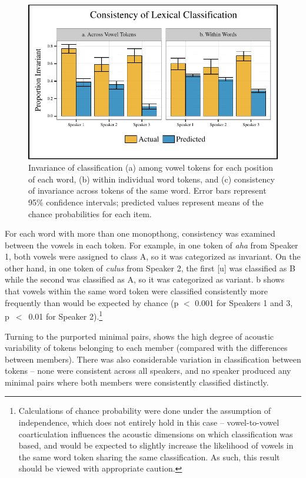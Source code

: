 \documentclass[output=paper,newtxmath,modfonts,nonflat,hidelinks]{langsci/langscibook}
\begin{document}
\begin{figure}
\includegraphics[height=.35\textheight]{figures/lexclass.pdf}
\caption{Invariance of classification (a) among vowel tokens for each position of each word, (b) within individual word tokens, and (c) consistency of invariance across tokens of the same word.  
Error bars represent 95\% confidence intervals; predicted values represent means of the chance probabilities for each item.}
\label{fig:kbgy:4}
\end{figure}

For each word with more than one monopthong, consistency was examined between the vowels in each token.  For example, in one token of \emph{aha} from Speaker 1, both vowels were assigned to class A, so it was categorized as invariant.  On the other hand, in one token of \emph{culus} from Speaker 2, the first [u] was classified as B while the second was classified as A, so it was categorized as variant.  b shows that vowels within the same word token were classified consistently more frequently than would be expected by chance (p $<$ 0.001 for Speakers 1 and 3, p~$<$~0.01 for Speaker 2).\footnote{Calculations of chance probability were done under the assumption of independence, which does not entirely hold in this case -- vowel-to-vowel coarticulation influences the acoustic dimensions on which classification was based, and would be expected to slightly increase the likelihood of vowels in the same word token sharing the same classification.  As such, this result should be viewed with appropriate caution.}

Turning to the purported minimal pairs,  shows the high degree of  acoustic variability of tokens belonging to each member (compared with the differences between members).  There was also considerable variation in classification between tokens -- none were consistent across all speakers, and no speaker produced any minimal pairs where both members were consistently classified distinctly. 
\end{document}
